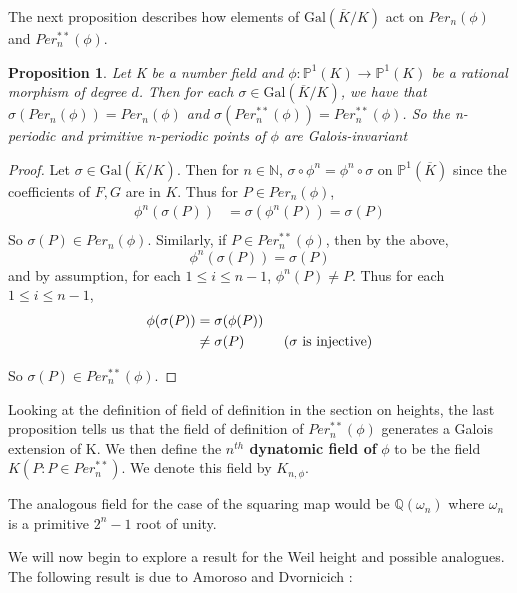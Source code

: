 \documentclass{amsart}
\newtheorem{prop}[thm]{Proposition}
\newcommand{\N}{\mathbb{N}}
\newcommand{\Q}{\mathbb{Q}}
\renewcommand{\P}{\mathbb{P}}
\begin{document}
The next proposition describes how elements of $\mathrm{Gal}(\overline{K}/K)$ act on $Per_n(\phi)$ and $Per_n^{**}(\phi)$.

\begin{prop}
Let K be a number field and $\phi: \P^1(K) \rightarrow \P^1(K)$ be a rational morphism of degree $d$. Then for each $\sigma \in \mathrm{Gal}(\overline{K}/K)$, we have that $\sigma(Per_n(\phi)) = Per_n(\phi)$ and $\sigma(Per_n^{**}(\phi)) = Per_n^{**}(\phi)$. So the n-periodic and primitive n-periodic points of $\phi$ are Galois-invariant
\end{prop}
 
\begin{proof}
Let $\sigma \in \mathrm{Gal}(\overline{K}/K)$. Then for $n \in \N$, $\sigma \circ \phi^n = \phi^n \circ \sigma$ on $\P^1(\overline{K})$ since the coefficients of $F,G$ are in $K$. Thus for $P \in Per_n(\phi)$,
\begin{align*}
\phi^n(\sigma(P)) 
&= \sigma(\phi^n(P)) = \sigma(P)  \\
\end{align*}
So $\sigma(P) \in Per_n(\phi)$. Similarly, if $P \in Per_n^{**}(\phi)$, then by the above, $$\phi^n(\sigma(P))  = \sigma(P)$$ and by assumption, for each $1 \leq i \leq n-1$, $\phi^n(P) \neq P$. Thus for each  $1 \leq i \leq n-1$,
\begin{align*}
\phi(\sigma(P)) 
&= \sigma(\phi(P))\\
& \neq \sigma(P) \hspace{10mm} \text{(}\sigma \text{ is injective)}  \\
\end{align*} 

So $\sigma(P) \in Per_n^{**}(\phi)$.

\end{proof} 
  
Looking at the definition of field of definition in the section on heights, the last proposition tells us that the field of definition of $Per_n^{**}(\phi)$ generates a Galois extension of K. We then define the \textbf{$n^{th}$ dynatomic field of }$\phi$ to be the field $K(P:P \in Per_n^{**})$. We denote this field by $K_{n,\phi}$.

The analogous field for the case of the squaring map would be $\Q(\omega_n)$ where $\omega_n$ is a primitive $2^{n}-1$ root of unity. 

We will now begin to explore a result for the Weil height and possible analogues. The following result is due to Amoroso and Dvornicich \cite{AD}:
\end{document}

